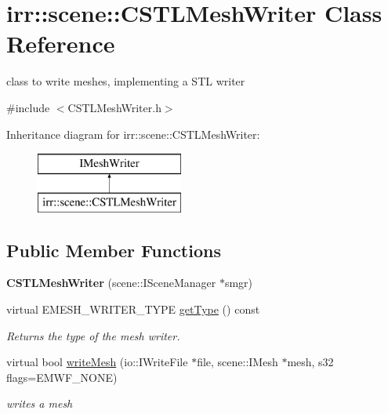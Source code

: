 \hypertarget{classirr_1_1scene_1_1_c_s_t_l_mesh_writer}{\section{irr\-:\-:scene\-:\-:C\-S\-T\-L\-Mesh\-Writer Class Reference}
\label{classirr_1_1scene_1_1_c_s_t_l_mesh_writer}
}


class to write meshes, implementing a S\-T\-L writer  




{\ttfamily \#include $<$C\-S\-T\-L\-Mesh\-Writer.\-h$>$}

Inheritance diagram for irr\-:\-:scene\-:\-:C\-S\-T\-L\-Mesh\-Writer\-:\begin{figure}[H]
\begin{center}
\leavevmode
\includegraphics[height=2.000000cm]{classirr_1_1scene_1_1_c_s_t_l_mesh_writer}
\end{center}
\end{figure}
\subsection*{Public Member Functions}
\begin{DoxyCompactItemize}
\item 
\hypertarget{classirr_1_1scene_1_1_c_s_t_l_mesh_writer_a3471f8c8a9bc7be3dc517c147d55541f}{{\bfseries C\-S\-T\-L\-Mesh\-Writer} (scene\-::\-I\-Scene\-Manager $\ast$smgr)}\label{classirr_1_1scene_1_1_c_s_t_l_mesh_writer_a3471f8c8a9bc7be3dc517c147d55541f}

\item 
\hypertarget{classirr_1_1scene_1_1_c_s_t_l_mesh_writer_ad3db2a0221537e09d73aa898e5c31623}{virtual E\-M\-E\-S\-H\-\_\-\-W\-R\-I\-T\-E\-R\-\_\-\-T\-Y\-P\-E \hyperlink{classirr_1_1scene_1_1_c_s_t_l_mesh_writer_ad3db2a0221537e09d73aa898e5c31623}{get\-Type} () const }\label{classirr_1_1scene_1_1_c_s_t_l_mesh_writer_ad3db2a0221537e09d73aa898e5c31623}

\begin{DoxyCompactList}\small\item\em Returns the type of the mesh writer. \end{DoxyCompactList}\item 
\hypertarget{classirr_1_1scene_1_1_c_s_t_l_mesh_writer_a50494f8accb95208937f7e83647aabaf}{virtual bool \hyperlink{classirr_1_1scene_1_1_c_s_t_l_mesh_writer_a50494f8accb95208937f7e83647aabaf}{write\-Mesh} (io\-::\-I\-Write\-File $\ast$file, scene\-::\-I\-Mesh $\ast$mesh, s32 flags=E\-M\-W\-F\-\_\-\-N\-O\-N\-E)}\label{classirr_1_1scene_1_1_c_s_t_l_mesh_writer_a50494f8accb95208937f7e83647aabaf}

\begin{DoxyCompactList}\small\item\em writes a mesh \end{DoxyCompactList}\end{DoxyCompactItemize}
